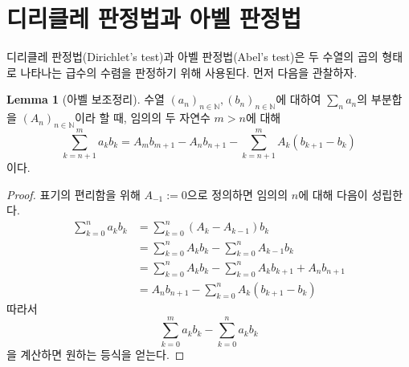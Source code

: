 \documentclass[11pt]{book}
\numberwithin{equation}{chapter}
\def\NN{\mathbb{N}}
\theoremstyle{definition}
\newtheorem{lem}[thm]{Lemma}
\begin{document}
\section{디리클레 판정법과 아벨 판정법} \label{sec5.8}

디리클레 판정법(Dirichlet's test)과 아벨 판정법(Abel's test)은 두 수열의 곱의 형태로 나타나는 급수의 수렴을 판정하기 위해 사용된다. 먼저 다음을 관찰하자.

\begin{lem}[아벨 보조정리]
    수열 \((a_n)_{n \in \NN}, (b_n)_{n \in \NN}\)에 대하여 \(\sum_n a_n\)의 부분합을 \((A_n)_{n \in \NN}\)이라 할 때, 임의의 두 자연수 \(m > n\)에 대해
    \[
        \sum_{k=n+1}^m a_k b_k = A_m b_{m+1} - A_n b_{n+1} - \sum_{k=n+1}^m A_k (b_{k+1} - b_k)
    \]
    이다.
\end{lem}
\begin{proof}
    표기의 편리함을 위해 \(A_{-1} := 0\)으로 정의하면 임의의 \(n\)에 대해 다음이 성립한다.
    \begin{align*}
        \sum_{k=0}^n a_k b_k &= \sum_{k=0}^n (A_{k} - A_{k-1}) b_k\\
        &= \sum_{k=0}^n A_k b_k - \sum_{k=0}^n A_{k-1} b_k\\
        &= \sum_{k=0}^n A_k b_k - \sum_{k=0}^n A_k b_{k+1} + A_n b_{n+1}\\
        &= A_n b_{n+1} - \sum_{k=0}^n A_k (b_{k+1} - b_k)
    \end{align*}
    따라서
    \[
    \sum_{k=0}^m a_k b_k - \sum_{k=0}^n a_k b_k    
    \]
    을 계산하면 원하는 등식을 얻는다.
\end{proof}
\end{document}
